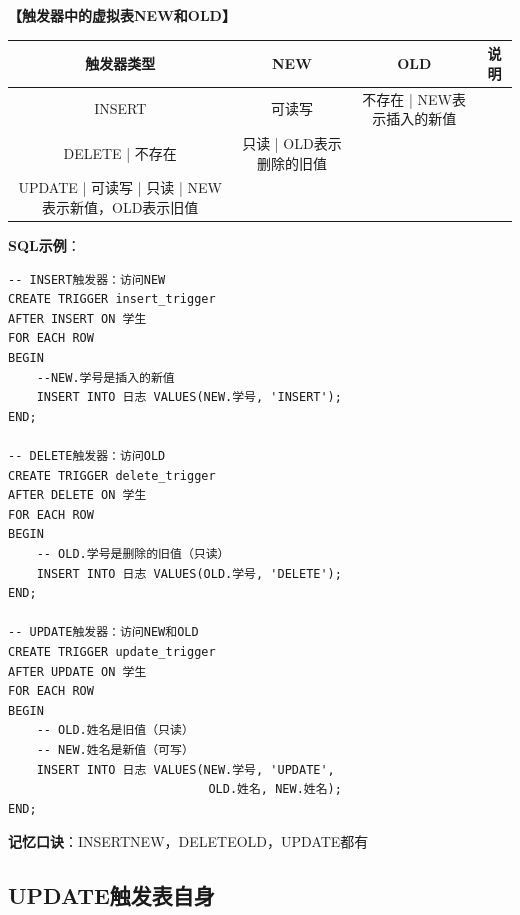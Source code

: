 \documentclass[12pt, a4paper]{article}
\newenvironment{bluebox}[1]{%
  \begin{trivlist}
  \item[\hskip\labelsep \textbf{#1}]
  \setlength{\parskip}{0.5ex}
  \setlength{\itemsep}{0.5ex}
}{%
  \end{trivlist}
  }
\begin{document}
\begin{bluebox}{NEW和OLD}
	\textbf{【触发器中的虚拟表NEW和OLD】}

	\begin{tabular}{|c|c|c|c|}
		\hline
		\textbf{触发器类型} & \textbf{NEW}    & \textbf{OLD}     & \textbf{说明} \\
		\hline
		INSERT         & 可读写             & 不存在 | NEW表示插入的新值               \\
		\hline
		DELETE | 不存在   & 只读 | OLD表示删除的旧值                                  \\
		\hline
		UPDATE | 可读写 | 只读 | NEW表示新值，OLD表示旧值                               \\
		\hline
	\end{tabular}

	\textbf{SQL示例}：
	\begin{verbatim}
-- INSERT触发器：访问NEW
CREATE TRIGGER insert_trigger
AFTER INSERT ON 学生
FOR EACH ROW
BEGIN
    --NEW.学号是插入的新值
    INSERT INTO 日志 VALUES(NEW.学号, 'INSERT');
END;

-- DELETE触发器：访问OLD
CREATE TRIGGER delete_trigger
AFTER DELETE ON 学生
FOR EACH ROW
BEGIN
    -- OLD.学号是删除的旧值（只读）
    INSERT INTO 日志 VALUES(OLD.学号, 'DELETE');
END;

-- UPDATE触发器：访问NEW和OLD
CREATE TRIGGER update_trigger
AFTER UPDATE ON 学生
FOR EACH ROW
BEGIN
    -- OLD.姓名是旧值（只读）
    -- NEW.姓名是新值（可写）
    INSERT INTO 日志 VALUES(NEW.学号, 'UPDATE',
                            OLD.姓名, NEW.姓名);
END;
	\end{verbatim}

	\textbf{记忆口诀}：INSERTNEW，DELETEOLD，UPDATE都有
\end{bluebox}

\subsection{UPDATE触发表自身}
\end{document}
